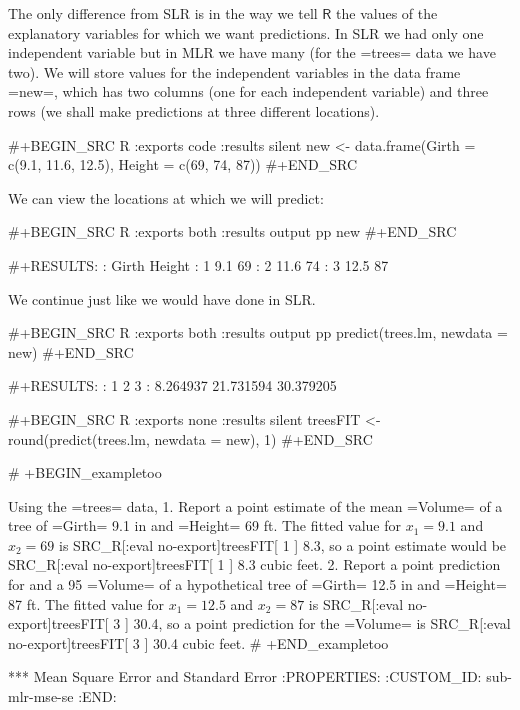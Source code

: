 The only difference from SLR is in the way we tell \(\mathsf{R}\) the
values of the explanatory variables for which we want predictions. In
SLR we had only one independent variable but in MLR we have many (for
the =trees= data we have two). We will store values for the
independent variables in the data frame =new=, which has two columns
(one for each independent variable) and three rows (we shall make
predictions at three different locations).

#+BEGIN_SRC R :exports code :results silent 
new <- data.frame(Girth = c(9.1, 11.6, 12.5), Height = c(69, 74, 87))
#+END_SRC

We can view the locations at which we will predict:

#+BEGIN_SRC R :exports both :results output pp 
new
#+END_SRC

#+RESULTS:
:   Girth Height
: 1   9.1     69
: 2  11.6     74
: 3  12.5     87

We continue just like we would have done in SLR.

#+BEGIN_SRC R :exports both :results output pp 
predict(trees.lm, newdata = new)
#+END_SRC

#+RESULTS:
:         1         2         3 
:  8.264937 21.731594 30.379205

#+BEGIN_SRC R :exports none :results silent
treesFIT <- round(predict(trees.lm, newdata = new), 1)
#+END_SRC

# +BEGIN_exampletoo

Using the =trees= data,
1. Report a point estimate of the mean =Volume= of a tree of =Girth=
   9.1 in and =Height= 69 ft.  The fitted value for \(x_{1}=9.1\) and
   \(x_{2} = 69\) is SRC_R[:eval no-export]{treesFIT[ 1 ]} 8.3, so a point estimate
   would be SRC_R[:eval no-export]{treesFIT[ 1 ]} 8.3 cubic feet.
2. Report a point prediction for and a 95%
   =Volume= of a hypothetical tree of =Girth= 12.5 in and =Height= 87
   ft.  The fitted value for \(x_{1} = 12.5\) and \(x_{2} = 87\) is
   SRC_R[:eval no-export]{treesFIT[ 3 ]} 30.4, so a point prediction for the =Volume=
   is SRC_R[:eval no-export]{treesFIT[ 3 ]} 30.4 cubic feet.
# +END_exampletoo

*** Mean Square Error and Standard Error
:PROPERTIES:
:CUSTOM_ID: sub-mlr-mse-se
:END:

